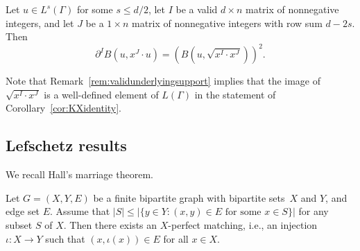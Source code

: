 \begin{coro}\label{cor:KXidentity}
Let $u \in L^s(\Gamma)$ for some $s \le d/2$, 
let $I$ be a valid $d \times n$ matrix of nonnegative integers, and   let $J$ be a $1 \times n$  matrix of nonnegative integers  with row sum $d - 2s$.
Then
$$\partial^I B(u, x^J \cdot u) = (B(u, \sqrt{x^I \cdot x^J}))^2.$$
\end{coro}

Note that Remark~\ref{rem:validunderlyingsupport} implies that the image of $\sqrt{x^I \cdot x^J}$ is a well-defined element of $L(\Gamma)$ in the statement of Corollary~\ref{cor:KXidentity}. 

\subsection{Lefschetz results}

We recall Hall's marriage theorem. 

\begin{theo}\label{thm:Hall}\cite{HallRepresentativesSubsets}
	Let $G = (X,Y,E)$ be a finite bipartite graph with bipartite sets~$X$ and $Y$, and edge set $E$. Assume that 
	$|S| \le |\{ y \in Y : (x,y) \in E \textrm{ for some } x \in S \}|$ for any subset $S$ of $X$.
	Then there exists an $X$-perfect matching, i.e., an injection $\iota\colon X \to Y$ such that $(x,\iota(x)) \in E$ for all $x \in X$. 
\end{theo}

